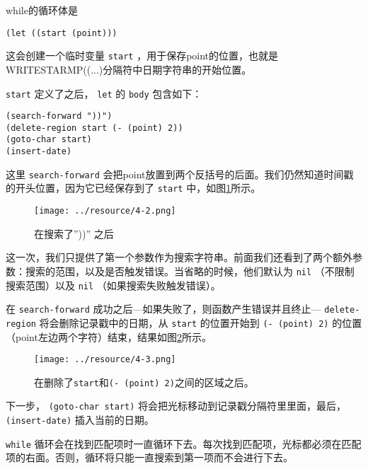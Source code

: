 while的循环体是

\begin{verbatim}
(let ((start (point)))
\end{verbatim}

这会创建一个临时变量 \texttt{start} ，用于保存point的位置，也就是WRITESTARMP((...)分隔符中日期字符串的开始位置。

\texttt{start} 定义了之后， \texttt{let} 的 \texttt{body} 包含如下：

\begin{verbatim}
(search-forward "))")
(delete-region start (- (point) 2))
(goto-char start)
(insert-date)
\end{verbatim}

这里 \texttt{search-forward} 会把point放置到两个反括号的后面。我们仍然知道时间戳的开头位置，因为它已经保存到了 \texttt{start} 中，如图\ref{figure:after-searching-for-))}所示。

\begin{figure}[hbt!]
  \texttt{[image: ../resource/4-2.png]}
  \caption{在搜索了”))” 之后}
  \label{figure:after-searching-for-))}
\end{figure}

这一次，我们只提供了第一个参数作为搜索字符串。前面我们还看到了两个额外参数：搜索的范围，以及是否触发错误。当省略的时候，他们默认为 \texttt{nil} （不限制搜索范围）以及 \texttt{nil} （如果搜索失败触发错误）。

在 \texttt{search-forward} 成功之后---如果失败了，则函数产生错误并且终止--- \texttt{delete-region} 将会删除记录戳中的日期，从 \texttt{start} 的位置开始到 \texttt{(- (point) 2)} 的位置（point左边两个字符）结束，结果如图\ref{figure:after-deleting-the-region-between-start-and-point}所示。

\begin{figure}[hbt!]
  \texttt{[image: ../resource/4-3.png]}
  \caption{在删除了\texttt{start}和\texttt{(- (point) 2)}之间的区域之后。}
  \label{figure:after-deleting-the-region-between-start-and-point}
\end{figure}

下一步， \texttt{(goto-char start)} 将会把光标移动到记录戳分隔符里里面，最后， \texttt{(insert-date)} 插入当前的日期。

\texttt{while} 循环会在找到匹配项时一直循环下去。每次找到匹配项，光标都必须在匹配项的右面。否则，循环将只能一直搜索到第一项而不会进行下去。

